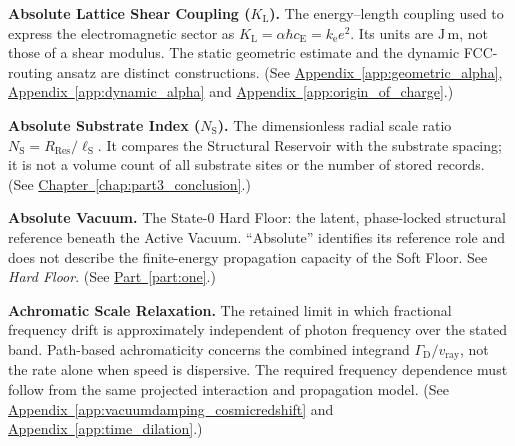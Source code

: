 \begin{description}
\setlength{\itemsep}{0.65\baselineskip}
\setlength{\parsep}{0pt}
\setlength{\emergencystretch}{1.5em}

\item[] \begin{minipage}[t]{\linewidth}
\textbf{Absolute Lattice Shear Coupling ($K_{\mathrm L}$).} The energy--length coupling used to express the electromagnetic sector as $K_{\mathrm L}=\alpha\hbar c_{\mathrm E}=k_{\mathrm e}e^2$. Its units are $\mathrm{J\,m}$, not those of a shear modulus. The static geometric estimate and the dynamic FCC-routing ansatz are distinct constructions.
(See \hyperref[app:geometric_alpha]{Appendix~\ref*{app:geometric_alpha}}, \hyperref[app:dynamic_alpha]{Appendix~\ref*{app:dynamic_alpha}} and \hyperref[app:origin_of_charge]{Appendix~\ref*{app:origin_of_charge}}.)
\end{minipage}

\item[] \begin{minipage}[t]{\linewidth}
\textbf{Absolute Substrate Index ($N_{\mathrm S}$).} The dimensionless radial scale ratio $N_{\mathrm S}=R_{\mathrm{Res}}/\ell_{\mathrm S}$. It compares the Structural Reservoir with the substrate spacing; it is not a volume count of all substrate sites or the number of stored records.
(See \hyperref[chap:part3_conclusion]{Chapter~\ref*{chap:part3_conclusion}}.)
\end{minipage}

\item[] \begin{minipage}[t]{\linewidth}
\textbf{Absolute Vacuum.} The State-0 Hard Floor: the latent, phase-locked structural reference beneath the Active Vacuum. ``Absolute'' identifies its reference role and does not describe the finite-energy propagation capacity of the Soft Floor. See \emph{Hard Floor}.
(See \hyperref[part:one]{Part~\ref*{part:one}}.)
\end{minipage}

\item[] \begin{minipage}[t]{\linewidth}
\textbf{Achromatic Scale Relaxation.} The retained limit in which fractional frequency drift is approximately independent of photon frequency over the stated band. Path-based achromaticity concerns the combined integrand $\Gamma_{\mathrm D}/v_{\mathrm{ray}}$, not the rate alone when speed is dispersive. The required frequency dependence must follow from the same projected interaction and propagation model.
(See \hyperref[app:vacuumdamping_cosmicredshift]{Appendix~\ref*{app:vacuumdamping_cosmicredshift}} and \hyperref[app:time_dilation]{Appendix~\ref*{app:time_dilation}}.)
\end{minipage}


\end{description}
